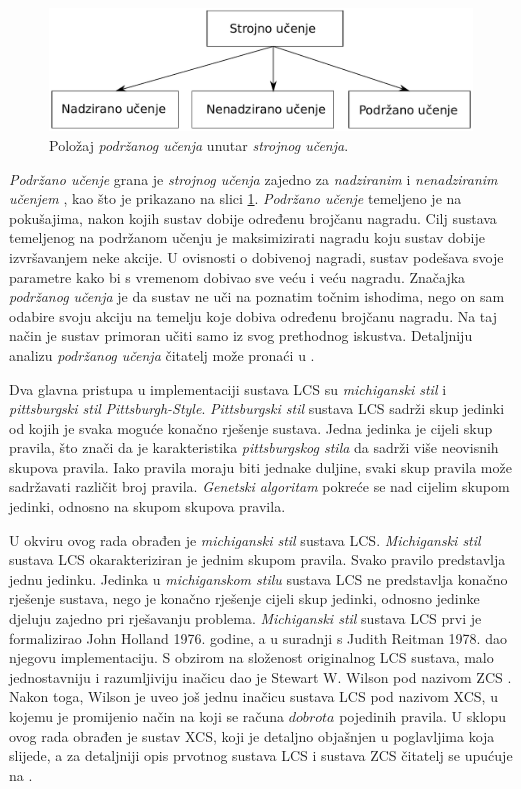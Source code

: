 \documentclass[times, utf8, zavrsni]{fer}
\begin{document}
\begin{figure}[!h]
    \centering
    \includegraphics[width=\textwidth]{img/ml.pdf}
    \caption{Položaj \emph{podržanog učenja} unutar \emph{strojnog učenja}.}
    \label{img:repol}
\end{figure}
\emph{Podržano učenje} grana je \emph{strojnog učenja}  zajedno za \emph{nadziranim}  i \emph{nenadziranim učenjem} , kao što je prikazano na slici \ref{img:repol}.
\emph{Podržano učenje} temeljeno je na pokušajima, nakon kojih sustav dobije određenu brojčanu nagradu.
Cilj sustava temeljenog na podržanom učenju je maksimizirati nagradu koju sustav dobije izvršavanjem neke akcije.
U ovisnosti o dobivenoj nagradi, sustav podešava svoje parametre kako bi s vremenom dobivao sve veću i veću nagradu.
Značajka \emph{podržanog učenja} je da sustav ne uči na poznatim točnim ishodima, nego on sam odabire svoju akciju na temelju koje dobiva određenu brojčanu nagradu.
Na taj način je sustav primoran učiti samo iz svog prethodnog iskustva.
Detaljniju analizu \emph{podržanog učenja} čitatelj može pronaći u \citep{7}.

Dva glavna pristupa u implementaciji sustava LCS su \emph{michiganski stil}  i \emph{pittsburgski stil} \emph{Pittsburgh-Style}.
\emph{Pittsburgski stil} sustava LCS sadrži skup jedinki od kojih je svaka moguće konačno rješenje sustava.
Jedna jedinka je cijeli skup pravila, što znači da je karakteristika \emph{pittsburgskog stila} da sadrži više neovisnih skupova pravila.
Iako pravila moraju biti jednake duljine, svaki skup pravila može sadržavati različit broj pravila.
\emph{Genetski algoritam} pokreće se nad cijelim skupom jedinki, odnosno na skupom skupova pravila.

U okviru ovog rada obrađen je \emph{michiganski stil} sustava LCS.
\emph{Michiganski stil} sustava LCS okarakteriziran je jednim skupom pravila.
Svako pravilo predstavlja jednu jedinku.
Jedinka u \emph{michiganskom stilu} sustava LCS ne predstavlja konačno rješenje sustava, nego je konačno rješenje cijeli skup jedinki, odnosno jedinke djeluju zajedno pri rješavanju problema.
\emph{Michiganski stil} sustava LCS prvi je formalizirao John Holland 1976. godine, a u suradnji s Judith Reitman 1978. dao njegovu implementaciju.
S obzirom na složenost originalnog LCS sustava, malo jednostavniju i razumljiviju inačicu dao je Stewart W. Wilson pod nazivom ZCS .
Nakon toga, Wilson je uveo još jednu inačicu sustava LCS pod nazivom XCS, u kojemu je promijenio način na koji se računa $dobrota$ pojedinih pravila.
U sklopu ovog rada obrađen je sustav XCS, koji je detaljno objašnjen u poglavljima koja slijede, a za detaljniji opis prvotnog sustava LCS i sustava ZCS čitatelj se upućuje na \citep{3}.
\end{document}
